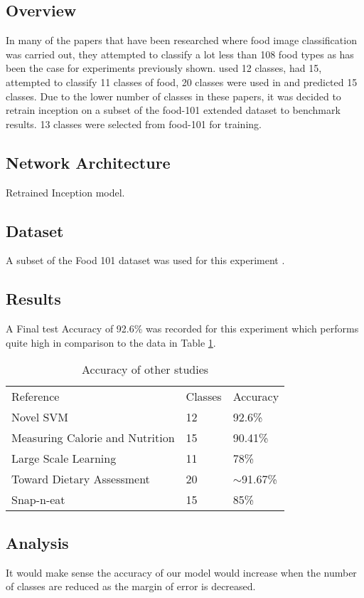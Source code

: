 \subsection*{Overview}
In many of the papers that have been researched where food image classification was carried out, they attempted to classify a lot less than 108 food types as has been the case for experiments previously shown.
\textcite{novelSVM} used 12 classes, \textcite{pouladzadeh2014measuring} had 15, \textcite{LSL_2015} attempted to classify 11 classes of food, 20 classes were used in \textcite{chen2010toward} and \textcite{snap} predicted 15 classes.
Due to the lower number of classes in these papers, it was decided to retrain inception on a subset of the food-101 extended dataset to benchmark results.
13 classes were selected from food-101 for training.

\subsection*{Network Architecture}
Retrained Inception model.

\subsection*{Dataset}
A subset of the Food 101 dataset was used for this experiment \textcite{food101}.

\subsection*{Results}
A Final test Accuracy of 92.6\% was recorded for this experiment which performs quite high in comparison to the data in Table \ref{classes_accuracy}.

\begin{table}[]
\centering
\caption{Accuracy of other studies}
\label{classes_accuracy}
\begin{tabular}{lll}
Reference                       & Classes & Accuracy      \\
Novel SVM                       & 12      & 92.6\%        \\
Measuring Calorie and Nutrition & 15      & 90.41\%       \\
Large Scale Learning            & 11      & 78\%          \\
Toward Dietary Assessment       & 20      & $\sim$91.67\% \\
Snap-n-eat                      & 15      & 85\%         
\end{tabular}
\end{table}

\subsection*{Analysis}
It would make sense the accuracy of our model would increase when the number of classes are reduced as the margin of error is decreased.